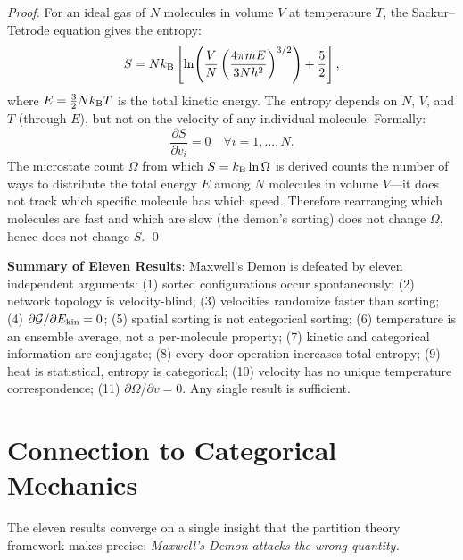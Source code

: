 \begin{proof}
For an ideal gas of $N$ molecules in volume $V$ at temperature $T$, the
Sackur--Tetrode equation gives the entropy:
\begin{equation}
  S = N k_{\mathrm{B}} \left[\ln\!\left(\frac{V}{N}\left(\frac{4\pi m E}{3Nh^2}\right)^{3/2}\right) + \frac{5}{2}\right],
  \label{eq:sackur_tetrode}
\end{equation}
where $E = \frac{3}{2}Nk_{\mathrm{B}} T$ is the total kinetic energy. The entropy depends
on $N$, $V$, and $T$ (through $E$), but not on the velocity of any individual
molecule. Formally:
\begin{equation}
  \frac{\partial S}{\partial v_i} = 0 \quad \forall i = 1, \ldots, N.
  \label{eq:ds_dv}
\end{equation}
The microstate count $\Omega$ from which $S = k_{\mathrm{B}} \ln \Omega$ is derived counts
the number of ways to distribute the total energy $E$ among $N$ molecules in
volume $V$---it does not track which specific molecule has which speed. Therefore
rearranging which molecules are fast and which are slow (the demon's sorting)
does not change $\Omega$, hence does not change $S$. \qed
\end{proof}

\begin{keyresult}
\textbf{Summary of Eleven Results}: Maxwell's Demon is defeated by eleven
independent arguments: (1) sorted configurations occur spontaneously; (2) network
topology is velocity-blind; (3) velocities randomize faster than sorting;
(4) $\partial \mathcal{G} / \partial E_{\mathrm{kin}} = 0$; (5) spatial
sorting is not categorical sorting; (6) temperature is an ensemble average,
not a per-molecule property; (7) kinetic and categorical information are conjugate;
(8) every door operation increases total entropy; (9) heat is statistical,
entropy is categorical; (10) velocity has no unique temperature correspondence;
(11) $\partial \Omega / \partial v = 0$. Any single result is sufficient.
\end{keyresult}

\section{Connection to Categorical Mechanics}
\label{sec:demon_categorical_mechanics}

The eleven results converge on a single insight that the partition theory
framework makes precise: \emph{Maxwell's Demon attacks the wrong quantity.}

